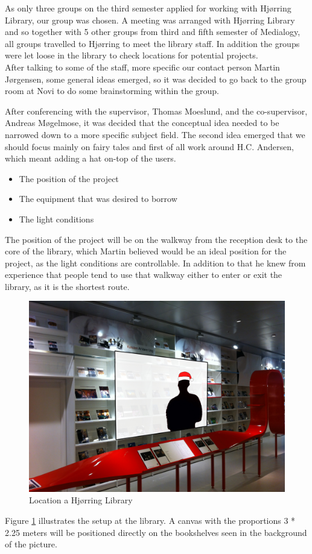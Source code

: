 As only three groups on the third semester applied for working with Hjørring Library, our group was chosen. A meeting was arranged with Hjørring Library and so together with 5 other groups from third and fifth semester of Medialogy, all groups travelled to Hjørring to meet the library staff. In addition the groups were let loose in the library to check locations for potential projects.\\
After talking to some of the staff, more specific our contact person Martin Jørgensen, some general ideas emerged, so it was decided to go back to the group room at Novi to do some brainstorming within the group.


After conferencing with the supervisor, Thomas Moeslund, and the co-supervisor, Andreas Møgelmose, it was decided that the conceptual idea needed to be narrowed down to a more specific subject field. The second idea emerged that we should focus mainly on fairy tales and first of all work around H.C. Andersen, which meant adding a hat on-top of the users.


\begin{itemize}
\item The position of the project
\item The equipment that was desired to borrow
\item The light conditions
\end{itemize}

The position of the project will be on the walkway from the reception desk to the core of the library, which Martin believed would be an ideal position for the project, as the light conditions are controllable. In addition to that he knew from experience that people tend to use that walkway either to enter or exit the library, as it is the shortest route.

\begin{figure}[htbp]
\centering
\includegraphics[width=1.00\textwidth]{Pictures/HjoerringLibrary/LocationJohannesHat.jpg}
\caption{Location a Hjørring Library}
\label{fig:concept_art}
\end{figure}
Figure \ref{fig:concept_art} illustrates the setup at the library. A canvas with the proportions 3 * 2.25 meters will be positioned directly on the bookshelves seen in the background of the picture.

